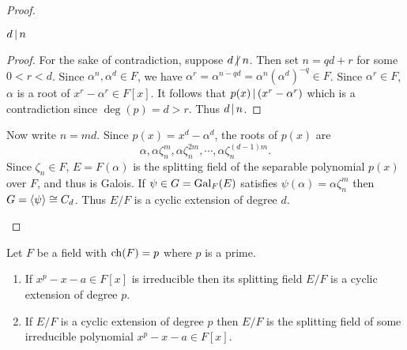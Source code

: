 \documentclass[11pt]{article}
\begin{document}
\begin{proof}
\begin{enumerate}
        \begin{claim}
            $d\,|\, n$
        \end{claim}
        \begin{proof}
            For the sake of contradiction, suppose $d\nd n$. Then set $n=qd+r$ for some $0<r<d$. Since $\alpha^n,\alpha^d\in F$, we have $\alpha^r=\alpha^{n-qd}=\alpha^n(\alpha^d)^{-q}\in F$. Since $\alpha^r\in F$, $\alpha$ is a root of $x^r-\alpha^r\in F[x]$. It follows that $p(x)\,|\,(x^r-\alpha^r)$ which is a contradiction since $\deg(p)=d>r$. Thus $d\,|\, n$.
            
        \end{proof}
        Now write $n=md$. Since $p(x)=x^d-\alpha^d$, the roots of $p(x)$ are
        \[\alpha,\alpha\zeta_n^m,\alpha\zeta_n^{2m},\cdots,\alpha\zeta_n^{(d-1)m}.\]
        Since $\zeta_n\in F$, $E=F(\alpha)$ is the splitting field of the separable polynomial $p(x)$ over $F$, and thus is Galois. If $\psi\in G=\operatorname{Gal}_F(E)$ satisfies $\psi(\alpha)=\alpha\zeta_n^m$ then $G=\langle\psi\rangle\cong C_d$. Thus $E/F$ is a cyclic extension of degree $d$.
    \end{enumerate}
\end{proof}

\begin{theorem}
    Let $F$ be a field with $\operatorname{ch}(F)=p$ where $p$ is a prime.
    \begin{enumerate}
        \item If $x^p-x-a\in F[x]$ is irreducible then its splitting field $E/F$ is a cyclic extension of degree $p$.
        \item If $E/F$ is a cyclic extension of degree $p$ then $E/F$ is the splitting field of some irreducible polynomial $x^p-x-a\in F[x]$.
    \end{enumerate}
\end{theorem}

\pagebreak
\end{document}
